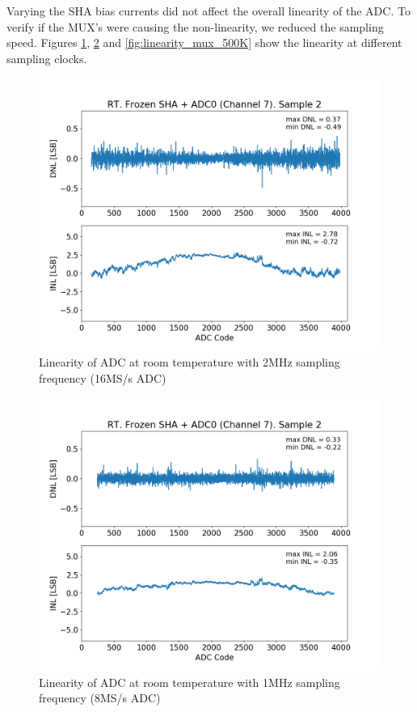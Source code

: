 Varying the SHA bias currents did not affect the overall linearity of the ADC. To verify if the MUX's were causing the non-linearity, we reduced the sampling speed. Figures \ref{fig:linearity_mux_2M}, \ref{fig:linearity_mux_1M} and \ref{fig:linearity_mux_500K} show the linearity at different sampling clocks. 
\begin{figure}[h!]
\centering
  \includegraphics[width=0.7\linewidth]{figures/prakash_fig/linearity_mux_2M.png}
  \caption{Linearity of ADC at room temperature with 2MHz sampling frequency (16MS/s ADC)}
  \label{fig:linearity_mux_2M}
\end{figure}

\begin{figure}[h!]
\centering
  \includegraphics[width=0.7\linewidth]{figures/prakash_fig/linearity_mux_1M.png}
  \caption{Linearity of ADC at room temperature with 1MHz sampling frequency (8MS/s ADC)}
  \label{fig:linearity_mux_1M}
\end{figure}


